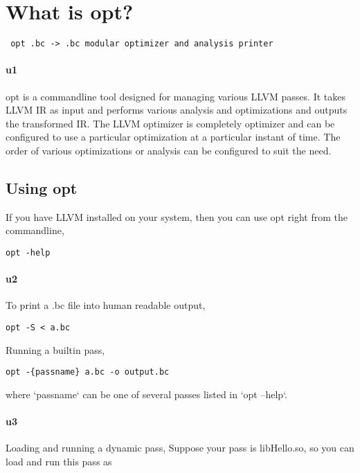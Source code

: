 \section{What is opt?}

\begin{lstlisting}
 opt .bc -> .bc modular optimizer and analysis printer
\end{lstlisting}

\paragraph{u1}
opt is a commandline tool designed for managing various LLVM passes. It takes
LLVM IR as input and performs various analysis
and optimizations and outputs the transformed IR. The LLVM optimizer is
completely optimizer and can be configured to use a particular optimization at
a particular instant of time. The order of various optimizations or analysis can
be configured to suit the need.

\subsection{Using opt}

If you have LLVM installed on your system, then you can use opt right from the commandline,

\begin{lstlisting}
opt -help
\end{lstlisting}

\paragraph{u2}
To print a .bc file into human readable output,

\begin{lstlisting}
opt -S < a.bc 
\end{lstlisting}

Running a builtin pass,

\begin{lstlisting}
opt -{passname} a.bc -o output.bc
\end{lstlisting}

where `passname` can be one of several passes listed in `opt --help`.

\paragraph{u3}
Loading and running a dynamic pass,
Suppose your pass is libHello.so, so you can load and run this pass as


